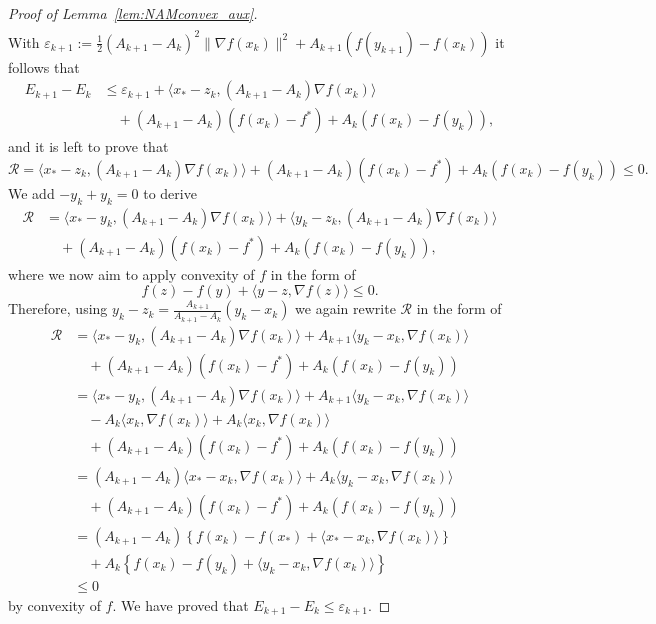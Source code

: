 \documentclass[12pt,openany]{book}
\theoremstyle{definition}
\theoremstyle{definition}
\begin{document}
\begin{proof}[Proof of Lemma~\ref{lem:NAMconvex_aux}]
\begin{align*}
\end{align*}
With $ \varepsilon_{k+1}:= \frac12 (A_{k+1}-A_k)^2 \|\nabla f(x_k)\|^2 + A_{k+1} (f(y_{k+1})-f(x_k))$ it follows that
\begin{align*}
E_{k+1}-E_k &\le \varepsilon_{k+1} +\langle x_\ast-z_{k},(A_{k+1}-A_k)\nabla f(x_k)\rangle\\
&\quad +(A_{k+1}-A_k)(f(x_k)-f^\ast)+A_k(f(x_k)-f(y_k)),
\end{align*}
and it is left to prove that
\[\mathcal R = \langle x_\ast-z_{k},(A_{k+1}-A_k)\nabla f(x_k)\rangle +(A_{k+1}-A_k)(f(x_k)-f^\ast)+A_k(f(x_k)-f(y_k))\le 0.\]
We add $-y_k+y_k=0$ to derive
\begin{align*}
\mathcal R &= \langle x_\ast-y_{k},(A_{k+1}-A_k)\nabla f(x_k)\rangle +\langle y_k-z_k,(A_{k+1}-A_k)\nabla f(x_k)\rangle\\ &\quad +(A_{k+1}-A_k)(f(x_k)-f^\ast)+A_k(f(x_k)-f(y_k)),
\end{align*}
where we now aim to apply convexity of $f$ in the form of 
\[f(z)-f(y) + \langle y-z,\nabla f(z)\rangle \le 0. \]
Therefore,  using $y_k-z_k = \frac{A_{k+1}}{A_{k+1}-A_k}(y_k-x_k)$ we again rewrite $\mathcal R$ in the form of
\begin{align*}
\mathcal R &=  \langle x_\ast-y_{k},(A_{k+1}-A_k)\nabla f(x_k)\rangle + A_{k+1}\langle y_k-x_k,\nabla f(x_k)\rangle\\
&\quad +(A_{k+1}-A_k)(f(x_k)-f^\ast)+A_k(f(x_k)-f(y_k))\\
&=\langle x_\ast-y_{k},(A_{k+1}-A_k)\nabla f(x_k)\rangle + A_{k+1}\langle y_k-x_k,\nabla f(x_k)\rangle\\
&\quad -A_k \langle x_k,\nabla f(x_k)\rangle + A_k \langle x_k,\nabla f(x_k)\rangle\\
&\quad +(A_{k+1}-A_k)(f(x_k)-f^\ast)+A_k(f(x_k)-f(y_k))\\
&= (A_{k+1}-A_k)\langle x_\ast - x_k,\nabla f(x_k)\rangle + A_k \langle y_k-x_k, \nabla f(x_k)\rangle \\
&\quad +(A_{k+1}-A_k)(f(x_k)-f^\ast)+A_k(f(x_k)-f(y_k))\\
&= (A_{k+1}-A_k)\left\{ f(x_k)-f(x_\ast) + \langle x_\ast-x_k,\nabla f(x_k)\rangle \right\}\\
&\quad + A_k \left\{ f(x_k)-f(y_k) + \langle y_k -x_k,\nabla f(x_k)\rangle \right\}\\
&\le 0
\end{align*}
by convexity of $f$. We have proved that
$E_{k+1}-E_k \le \varepsilon_{k+1}$.
\end{proof}
\end{document}
